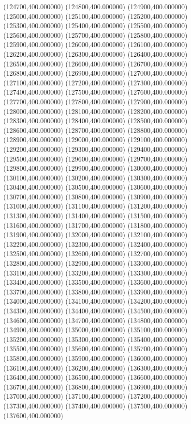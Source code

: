(124700,400.000000)
(124800,400.000000)
(124900,400.000000)
(125000,400.000000)
(125100,400.000000)
(125200,400.000000)
(125300,400.000000)
(125400,400.000000)
(125500,400.000000)
(125600,400.000000)
(125700,400.000000)
(125800,400.000000)
(125900,400.000000)
(126000,400.000000)
(126100,400.000000)
(126200,400.000000)
(126300,400.000000)
(126400,400.000000)
(126500,400.000000)
(126600,400.000000)
(126700,400.000000)
(126800,400.000000)
(126900,400.000000)
(127000,400.000000)
(127100,400.000000)
(127200,400.000000)
(127300,400.000000)
(127400,400.000000)
(127500,400.000000)
(127600,400.000000)
(127700,400.000000)
(127800,400.000000)
(127900,400.000000)
(128000,400.000000)
(128100,400.000000)
(128200,400.000000)
(128300,400.000000)
(128400,400.000000)
(128500,400.000000)
(128600,400.000000)
(128700,400.000000)
(128800,400.000000)
(128900,400.000000)
(129000,400.000000)
(129100,400.000000)
(129200,400.000000)
(129300,400.000000)
(129400,400.000000)
(129500,400.000000)
(129600,400.000000)
(129700,400.000000)
(129800,400.000000)
(129900,400.000000)
(130000,400.000000)
(130100,400.000000)
(130200,400.000000)
(130300,400.000000)
(130400,400.000000)
(130500,400.000000)
(130600,400.000000)
(130700,400.000000)
(130800,400.000000)
(130900,400.000000)
(131000,400.000000)
(131100,400.000000)
(131200,400.000000)
(131300,400.000000)
(131400,400.000000)
(131500,400.000000)
(131600,400.000000)
(131700,400.000000)
(131800,400.000000)
(131900,400.000000)
(132000,400.000000)
(132100,400.000000)
(132200,400.000000)
(132300,400.000000)
(132400,400.000000)
(132500,400.000000)
(132600,400.000000)
(132700,400.000000)
(132800,400.000000)
(132900,400.000000)
(133000,400.000000)
(133100,400.000000)
(133200,400.000000)
(133300,400.000000)
(133400,400.000000)
(133500,400.000000)
(133600,400.000000)
(133700,400.000000)
(133800,400.000000)
(133900,400.000000)
(134000,400.000000)
(134100,400.000000)
(134200,400.000000)
(134300,400.000000)
(134400,400.000000)
(134500,400.000000)
(134600,400.000000)
(134700,400.000000)
(134800,400.000000)
(134900,400.000000)
(135000,400.000000)
(135100,400.000000)
(135200,400.000000)
(135300,400.000000)
(135400,400.000000)
(135500,400.000000)
(135600,400.000000)
(135700,400.000000)
(135800,400.000000)
(135900,400.000000)
(136000,400.000000)
(136100,400.000000)
(136200,400.000000)
(136300,400.000000)
(136400,400.000000)
(136500,400.000000)
(136600,400.000000)
(136700,400.000000)
(136800,400.000000)
(136900,400.000000)
(137000,400.000000)
(137100,400.000000)
(137200,400.000000)
(137300,400.000000)
(137400,400.000000)
(137500,400.000000)
(137600,400.000000)
